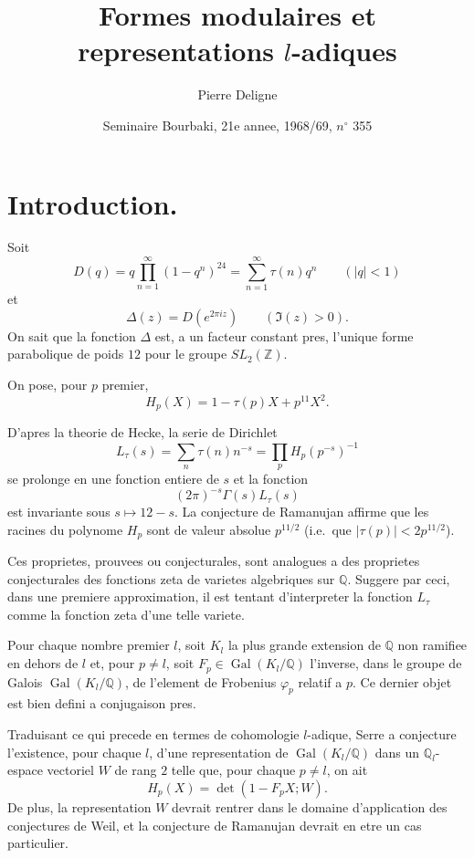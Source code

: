 \documentclass[11pt,reqno]{amsart}
\theoremstyle{plain}
\theoremstyle{remark}
\DeclareMathOperator{\Gal}{Gal}
\newcommand{\Z}{\mathbb{Z}}
\newcommand{\Q}{\mathbb{Q}}
\numberwithin{equation}{section}
\begin{document}
\title{Formes modulaires et representations $l$-adiques}
\author{Pierre Deligne}
\date{Seminaire Bourbaki, 21e annee, 1968/69, $n^{\circ}$ 355}
\maketitle

\section{Introduction.}\label{sec:1}

Soit
\begin{equation}\label{eq:D}
D(q) = q \prod_{n=1}^{\infty} (1-q^n)^{24} = \sum_{n=1}^{\infty} \tau(n) q^n \qquad (|q|<1)
\end{equation}
et
\[
\Delta(z) = D(e^{2\pi iz}) \qquad (\Im(z) > 0).
\]
On sait que la fonction $\Delta$ est, a un facteur constant pres, l'unique forme parabolique de poids $12$ pour le groupe $SL_2(\Z)$.

On pose, pour $p$ premier,
\[
H_p(X) = 1 - \tau(p) X + p^{11} X^2.
\]

D'apres la theorie de Hecke, la serie de Dirichlet
\begin{equation}
L_\tau(s) = \sum_{n} \tau(n) n^{-s} = \prod_p H_p(p^{-s})^{-1}
\end{equation}
se prolonge en une fonction entiere de $s$ et la fonction
\[
(2\pi)^{-s} \Gamma(s) L_\tau(s)
\]
est invariante sous $s \mapsto 12-s$. La conjecture de Ramanujan affirme que les racines du polynome $H_p$ sont de valeur absolue $p^{11/2}$ (i.e.~que $|\tau(p)| < 2p^{11/2}$).

Ces proprietes, prouvees ou conjecturales, sont analogues a des proprietes conjecturales des fonctions zeta de varietes algebriques sur $\Q$. Suggere par ceci, dans une premiere approximation, il est tentant d'interpreter la fonction $L_\tau$ comme la fonction zeta d'une telle variete.

Pour chaque nombre premier $l$, soit $K_l$ la plus grande extension de $\Q$ non ramifiee en dehors de $l$ et, pour $p \neq l$, soit $F_p \in \Gal(K_l/\Q)$ l'inverse, dans le groupe de Galois $\Gal(K_l/\Q)$, de l'element de Frobenius $\varphi_p$ relatif a $p$. Ce dernier objet est bien defini a conjugaison pres.

Traduisant ce qui precede en termes de cohomologie $l$-adique, Serre a conjecture l'existence, pour chaque $l$, d'une representation de $\Gal(K_l/\Q)$ dans un $\Q_l$-espace vectoriel $W$ de rang $2$ telle que, pour chaque $p \neq l$, on ait
\[
H_p(X) = \det(1 - F_p X; W).
\]
De plus, la representation $W$ devrait rentrer dans le domaine d'application des conjectures de Weil, et la conjecture de Ramanujan devrait en etre un cas particulier.
\end{document}
